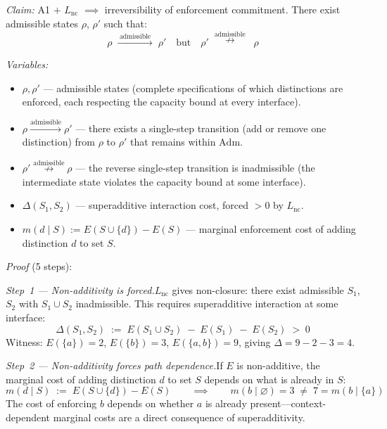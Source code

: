 \documentclass[11pt]{article}
\newcommand{\Adm}{\mathrm{Adm}}
\newcommand{\Lnc}{L_{\mathrm{nc}}}
\newcommand{\Lirr}{L_{\mathrm{irr}}}
\begin{document}
\begin{tcolorbox}[apfbox, title={Lemma $\Lirr$ (Irreversibility) --- Full Proof}]
\textit{Claim:} A1 $+$ $\Lnc$ $\implies$ irreversibility of enforcement commitment.  There exist admissible states $\rho$, $\rho'$ such that:
\begin{equation}
\rho \;\xrightarrow{\;\text{admissible}\;}\; \rho' \quad\text{but}\quad \rho' \;\overset{\text{admissible}}{\nrightarrow}\;\; \rho
\label{eq:lirr_asymmetry}
\end{equation}

\smallskip\noindent\textit{Variables:}
\begin{itemize}[nosep,leftmargin=2em]
\item $\rho, \rho'$ --- admissible states (complete specifications of which distinctions are enforced, each respecting the capacity bound at every interface).
\item $\rho \xrightarrow{\text{admissible}} \rho'$ --- there exists a single-step transition (add or remove one distinction) from $\rho$ to $\rho'$ that remains within $\Adm$.
\item $\rho' \overset{\text{admissible}}{\nrightarrow} \rho$ --- the reverse single-step transition is inadmissible (the intermediate state violates the capacity bound at some interface).
\item $\Delta(S_1, S_2)$ --- superadditive interaction cost, forced $> 0$ by $\Lnc$.
\item $m(d \mid S) := E(S \cup \{d\}) - E(S)$ --- marginal enforcement cost of adding distinction $d$ to set $S$.
\end{itemize}
\end{tcolorbox}

\textit{Proof} (5 steps):

\textit{Step~1 --- Non-additivity is forced.}\quad $\Lnc$ gives non-closure: there exist admissible $S_1$, $S_2$ with $S_1 \cup S_2$ inadmissible.  This requires superadditive interaction at some interface:
\begin{equation}
\Delta(S_1, S_2) \;:=\; E(S_1 \cup S_2) \;-\; E(S_1) \;-\; E(S_2) \;>\; 0
\end{equation}
Witness: $E(\{a\}) = 2$, $E(\{b\}) = 3$, $E(\{a,b\}) = 9$, giving $\Delta = 9 - 2 - 3 = 4$.

\textit{Step~2 --- Non-additivity forces path dependence.}\quad If $E$ is non-additive, the marginal cost of adding distinction $d$ to set $S$ depends on what is already in $S$:
\begin{equation}
m(d \mid S) \;:=\; E(S \cup \{d\}) - E(S) \qquad\implies\qquad m(b \mid \varnothing) = 3 \;\ne\; 7 = m(b \mid \{a\})
\end{equation}
The cost of enforcing $b$ depends on whether $a$ is already present---context-dependent marginal costs are a direct consequence of superadditivity.
\end{document}
